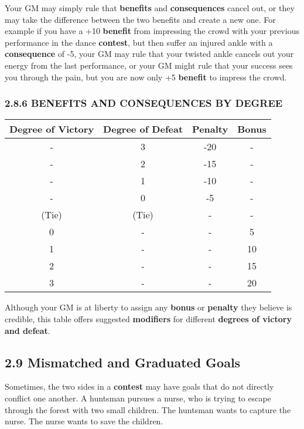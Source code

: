 \documentclass[
  11pt,
]{article}
\begin{document}
Your GM may simply rule that \textbf{benefits} and \textbf{consequences}
cancel out, or they may take the difference between the two benefits and
create a new one. For example if you have a +10 \textbf{benefit} from
impressing the crowd with your previous performance in the dance
\textbf{contest}, but then suffer an injured ankle with a
\textbf{consequence} of -5, your GM may rule that your twisted ankle
cancels out your energy from the last performance, or your GM might rule
that your success sees you through the pain, but you are now only +5
\textbf{benefit} to impress the crowd.

\hypertarget{benefits-and-consequences-by-degree}{%
\subsubsection{2.8.6 BENEFITS AND CONSEQUENCES BY
DEGREE}\label{benefits-and-consequences-by-degree}}

\begin{longtable}[]{@{}cccc@{}}
\toprule
Degree of Victory & Degree of Defeat & Penalty & Bonus \\
\midrule
\endhead
- & 3 & -20 & - \\
- & 2 & -15 & - \\
- & 1 & -10 & - \\
- & 0 & -5 & - \\
(Tie) & (Tie) & - & - \\
0 & - & - & 5 \\
1 & - & - & 10 \\
2 & - & - & 15 \\
3 & - & - & 20 \\
\bottomrule
\end{longtable}

Although your GM is at liberty to assign any \textbf{bonus} or
\textbf{penalty} they believe is credible, this table offers suggested
\textbf{modifiers} for different \textbf{degrees of victory and defeat}.

\hypertarget{mismatched-and-graduated-goals}{%
\subsection{2.9 Mismatched and Graduated
Goals}\label{mismatched-and-graduated-goals}}

Sometimes, the two sides in a \textbf{contest} may have goals that do
not directly conflict one another. A huntsman pursues a nurse, who is
trying to escape through the forest with two small children. The
huntsman wants to capture the nurse. The nurse wants to save the
children.
\end{document}
